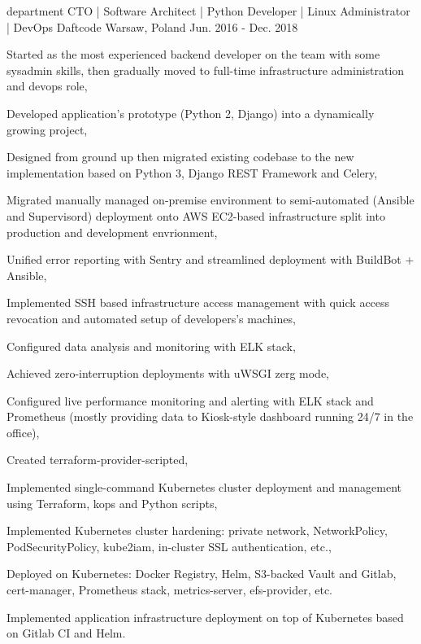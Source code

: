 \begin{cventries}
  \cventry
  {department CTO | Software Architect | Python Developer | Linux Administrator | DevOps} %
  {Daftcode} %
  {Warsaw, Poland} %
  {Jun. 2016 - Dec. 2018} %
  {
    \begin{cvitems} %
      \item {Started as the most experienced backend developer on the team with some sysadmin skills, then gradually moved to full-time infrastructure administration and devops role,}
      \item {Developed application's prototype (Python 2, Django) into a dynamically growing project,}
      \item {Designed from ground up then migrated existing codebase to the new implementation based on Python 3, Django REST Framework and Celery,}
      \item {Migrated manually managed on-premise environment to semi-automated (Ansible and Supervisord) deployment onto AWS EC2-based infrastructure split into production and development envrionment,}
      \item {Unified error reporting with Sentry and streamlined deployment with BuildBot + Ansible,}
      \item {Implemented SSH based infrastructure access management with quick access revocation and automated setup of developers's machines,}
      \item {Configured data analysis and monitoring with ELK stack,}
      \item {Achieved zero-interruption deployments with uWSGI zerg mode,}
      \item {Configured live performance monitoring and alerting with ELK stack and Prometheus (mostly providing data to Kiosk-style dashboard running 24/7 in the office),}
      \item {Created terraform-provider-scripted,}
      \item {Implemented single-command Kubernetes cluster deployment and management using Terraform, kops and Python scripts,}
      \item {Implemented Kubernetes cluster hardening: private network, NetworkPolicy, PodSecurityPolicy, kube2iam, in-cluster SSL authentication, etc.,}
      \item {Deployed on Kubernetes: Docker Registry, Helm, S3-backed Vault and Gitlab, cert-manager, Prometheus stack, metrics-server, efs-provider, etc.}
      \item {Implemented application infrastructure deployment on top of Kubernetes based on Gitlab CI and Helm.}
    \end{cvitems}
  }


\end{cventries}

